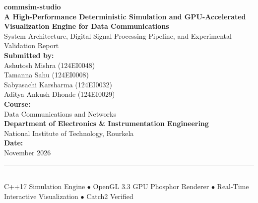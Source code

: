 \documentclass[10pt,twocolumn]{article}
\begin{document}
\begin{titlepage}
\centering
\vspace*{1.5cm}

{\Huge \textbf{commsim-studio}}\\[0.8em]
{\Large \textbf{A High-Performance Deterministic Simulation and GPU-Accelerated Visualization Engine for Data Communications}}\\[1.5em]
{\large System Architecture, Digital Signal Processing Pipeline, and Experimental Validation Report}\\[3.0cm]

\textbf{Submitted by:}\\[0.6em]
{\large Ashutosh Mishra} \quad (124EI0048)\\[0.3em]
{\large Tamanna Sahu} \quad (124EI0008)\\[0.3em]
{\large Sabyasachi Karsharma} \quad (124EI0032)\\[0.3em]
{\large Aditya Ankush Dhonde} \quad (124EI0029)\\[1.2cm]

\textbf{Course:}\\
{\Large Data Communications and Networks}\\[1.0cm]

\textbf{Department of Electronics \& Instrumentation Engineering}\\
{\large National Institute of Technology, Rourkela}\\[1.5cm]

\textbf{Date:}\\
November 2026\\[2.0cm]

\vfill
\noindent\rule{\linewidth}{0.4pt}\\[0.5em]
{\small C++17 Simulation Engine $\bullet$ OpenGL 3.3 GPU Phosphor Renderer $\bullet$ Real-Time Interactive Visualization $\bullet$ Catch2 Verified}
\end{titlepage}

\twocolumn
\end{document}
